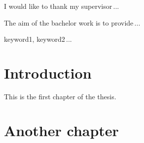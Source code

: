 \documentclass[12pt,oneside]{fithesis}
\begin{document}
  \FrontMatter
  \ThesisTitlePage
  \begin{ThesisDeclaration}
  \DeclarationText
  \AdvisorName
  \end{ThesisDeclaration}
  \begin{ThesisThanks}
  I would like to thank my supervisor\,...
  \end{ThesisThanks}
  \begin{ThesisAbstract}
  The aim of the bachelor work is to provide\,...
  \end{ThesisAbstract}
  \begin{ThesisKeyWords}
  keyword1, keyword2\,...
  \end{ThesisKeyWords}
  \MainMatter
  \chapter{Introduction}
  This is the first chapter of the thesis.
  \chapter{Another chapter}
  \Blindtext
  \tableofcontents %
\end{document}
